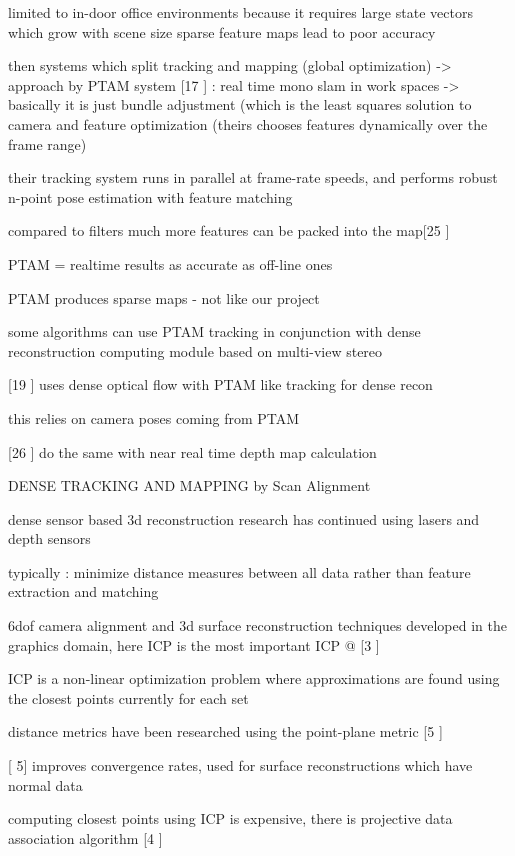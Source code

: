 limited to in-door office environments because it requires large state vectors which grow with scene size
sparse feature maps lead to poor accuracy

then systems which split tracking and mapping (global optimization) -> approach by PTAM system [17 \cite{Klein07Parallel}]
: real time mono slam in work spaces -> basically it is just bundle adjustment (which is the least squares solution to camera and feature optimization (theirs chooses features dynamically over the frame range)

their tracking system runs in parallel at frame-rate speeds, and performs robust n-point pose estimation with feature matching

compared to filters much more features can be packed into the map[25 \cite{Strasdat10Real} ]

PTAM = realtime results as accurate as off-line ones

PTAM produces sparse maps - not like our project

some algorithms can use PTAM tracking in conjunction with dense reconstruction computing module based on multi-view stereo

[19 \cite{Newcombe10Live}] uses dense optical flow with PTAM like tracking for dense recon

this relies on camera poses coming from PTAM

[26 \cite{Stuhmer10Real}] do the same with near real time depth map calculation

DENSE TRACKING AND MAPPING by Scan Alignment

dense sensor based 3d reconstruction research has continued using lasers and depth sensors

typically : minimize distance measures between all data rather than feature extraction and matching

6dof camera alignment and 3d surface reconstruction techniques developed in the graphics domain, here ICP is the most important
ICP @ [3 \cite{Besl92Method} ]

ICP is a non-linear optimization problem where approximations are found using the closest points currently for each
set

distance metrics have been researched using the point-plane metric [5 \cite{Chen92Object}]

[\cite{Chen92Object} 5] improves convergence rates, used for surface reconstructions which have normal data

computing closest points using ICP is expensive, there is projective data association algorithm [4 \cite{Blais95Registering}]

